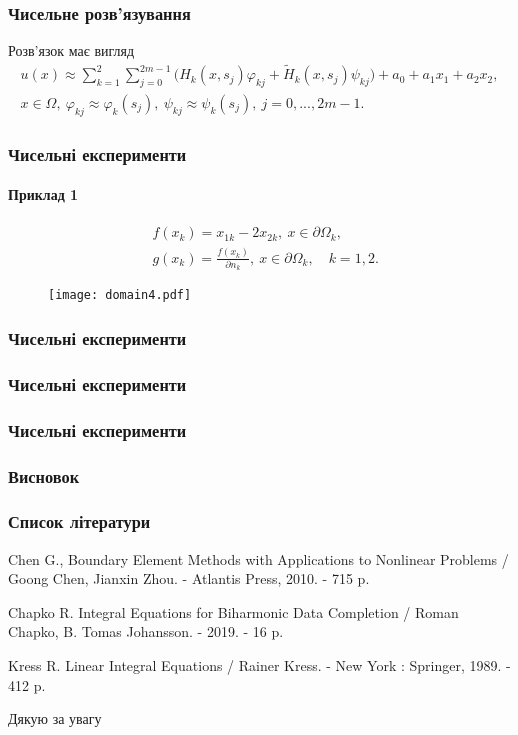 \documentclass[10pt]{beamer}
\begin{document}
\begin{frame}
\frametitle{Чисельне розв'язування}
Розв'язок має вигляд
 \begin{equation} \label{solutionEq}
 \begin{split}
 	u(x) \approx\sum_{k=1}^{2}\sum_{j=0}^{2m-1}\bigg(H_k(x,s_j)\varphi_{kj}+\tilde{H}_k(x,s_j)\psi_{kj}\bigg) +a_0+a_1x_1+a_2x_2,\\
 	x\in\Omega, \ \varphi_{kj}\approx\varphi_k(s_j), \ \psi_{kj}\approx\psi_k(s_j), \ j=0,...,2m-1.
 \end{split}
 \end{equation}
\end{frame}
 
\begin{frame}
\frametitle{Чисельні експерименти}
\framesubtitle{Приклад 1}
\begin{equation}
 \begin{split}
 \label{bound}
	&f(x_k)=x_{1k}-2x_{2k}, \ x\in\partial\Omega_k, \\
	&g(x_k)=\frac{f(x_k)}{\partial n_k}, \ x\in\partial\Omega_k, \quad k =1,2. 
 \end{split}
 \end{equation}
 \begin{figure}[h!]
\centering
	\texttt{[image: domain4.pdf]}
	\vspace*{-1cm}
\end{figure}
\end{frame}

\begin{frame}
\frametitle{Чисельні експерименти}

\end{frame}

\begin{frame}
\frametitle{Чисельні експерименти}

\end{frame}

\begin{frame}
\frametitle{Чисельні експерименти}

\end{frame}

\begin{frame}
\frametitle{Висновок}

\end{frame}


\begin{frame}
\frametitle{Список літератури}
\begin{thebibliography}{99}
Chen G., Boundary Element Methods with Applications to Nonlinear Problems / Goong Chen, Jianxin Zhou. - Atlantis Press, 2010. - 715 p.

Chapko R. Integral Equations for Biharmonic Data Completion / Roman Chapko, B. Tomas Johansson. - 2019. - 16 p.
 
Kress R. Linear Integral Equations / Rainer Kress. - New York : Springer, 1989. - 412 p.

\end{thebibliography}
\end{frame}

\begin{frame}{}
  \centering \huge
  Дякую за увагу
\end{frame}
 
\end{document}
